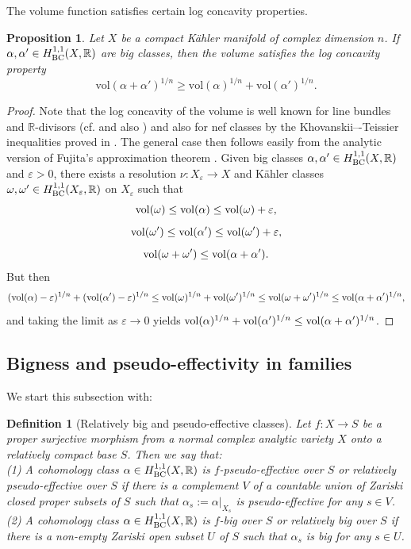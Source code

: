 \documentclass[12pt]{amsart}
\numberwithin{equation}{section}
\newtheorem{proposition}[theorem]{Proposition}
\theoremstyle{definition}
\theoremstyle{plain}
\newtheorem{definition}  [theorem]     {Definition}
\newtheorem*{thm A*}{Theorem A}
\newtheorem*{thm B*}{Theorem B}
\newtheorem*{thm C*}{Theorem C}
\newtheorem*{thm D*}{Theorem D}
\theoremstyle{definition}
\renewcommand{\1}{\mathds{1}}
\newcommand{\vol}{\mathrm{vol}}
\renewcommand{\>}{\rightarrow}
\newcommand{\R}{\mathbb R}
\begin{document}
The volume function satisfies certain log concavity properties.
\begin{proposition}\label{r-logc}
Let $X$ be a compact K\"ahler manifold of complex dimension $n$. If $\alpha, \alpha ' \in H^{1,1}_{\rm{BC}}(X, \mathbb{R})$ are big classes, then the volume satisfies the log concavity property $$\vol(\alpha + \alpha ')^{1/n} \ge \vol (\alpha)^{1/n} + \vol (\alpha ')^{1/n}.$$
\end{proposition}
\begin{proof}
Note that the log concavity of the volume is well known for line bundles and $\R$-divisors (cf. \cite[Remark 2.2.50]{Laza04} and also \cite[Corollary 4.12]{LM09}) and also for nef classes by the Khovanskii–-Teissier inequalities proved in \cite{Dem93}. The general case then follows easily from the analytic version of Fujita’s
approximation theorem  \cite[Theorem 1.4]{Boucksom02}. Given big classes $\alpha,\alpha' \in H^{1,1}_{\rm{BC}}(X, \mathbb{R})$ and $\varepsilon >0$, there exists a resolution $\nu : X_\varepsilon \to X$ and K\"ahler classes $\omega ,\omega ' \in H^{1,1}_{\rm{BC}}(X_{\varepsilon}, \mathbb{R})$ on $X_\varepsilon$ such that
$${\rm vol}(\omega )\leq {\rm vol}(\alpha)\leq {\rm vol}(\omega )+\varepsilon ,$$ $${\rm vol}(\omega') \leq {\rm vol}(\alpha ')\leq {\rm vol}(\omega ') +\varepsilon,$$ $${\rm vol}(\omega +\omega')\leq{\rm vol}(\alpha+\alpha ').$$
But then
$$({\rm vol}(\alpha )-\varepsilon)^{1/n}+({\rm vol}(\alpha')-\varepsilon)^{1/n}\le {\rm vol}(\omega )^{1/n} +{\rm vol}(\omega')^{1/n}\le {\rm vol}(\omega +\omega')^{1/n}\le {\rm vol}(\alpha+\alpha')^{1/n},$$
and taking the limit as $\varepsilon \to 0$ yields ${\rm vol}(\alpha)^{1/n}+{\rm vol}(\alpha')^{1/n} \le {\rm vol}(\alpha+\alpha')^{1/n}$.
\end{proof}

\subsection{Bigness and pseudo-effectivity in families} 
We start this subsection with: 
\begin{definition}[Relatively big and pseudo-effective classes]\label{pseffclass}
Let $f:X\to S$ be a proper surjective morphism from a normal complex analytic variety $X$ onto a relatively compact base $S$. Then we say that:\\
\emph{(1)} A cohomology class $\alpha\in H^{1,1}_{\rm{BC}}(X,\mathbb{R})$ is \emph{$f$-pseudo-effective over $S$} or \emph{relatively pseudo-effective over $S$} if there is a complement $V$ of a countable union of Zariski closed proper subsets of $S$ such that $\alpha_s:=\alpha|_{X_s}$ is pseudo-effective for any $s\in V$.\\
\emph{(2)} A cohomology class $\alpha\in H^{1,1}_{\rm{BC}}(X,\mathbb{R})$ is \emph{$f$-big over $S$} or \emph{relatively big over $S$} if there is a non-empty Zariski open subset $U$ of $S$ such that $\alpha_s$ is big for any $s\in U$.  
\end{definition}
\end{document}
